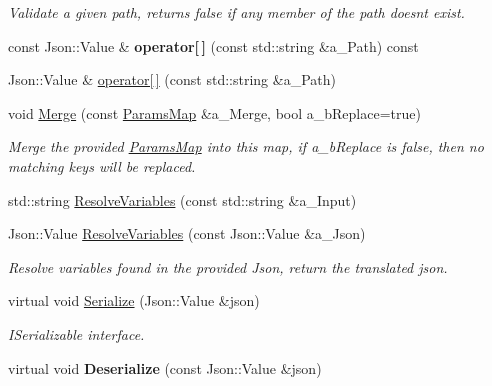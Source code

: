 \begin{DoxyCompactItemize}
\begin{DoxyCompactList}\small\item\em Validate a given path, returns false if any member of the path doesn\textquotesingle{}t exist. \end{DoxyCompactList}\item 
\mbox{\label{class_params_map_acf47e7ad87edf3d071a1f67eb46644e4}} 
const Json\+::\+Value \& {\bfseries operator\mbox{[}$\,$\mbox{]}} (const std\+::string \&a\+\_\+\+Path) const
\item 
Json\+::\+Value \& \hyperlink{class_params_map_a8a33e06714e2955ce0b81d27a8b59da2}{operator\mbox{[}$\,$\mbox{]}} (const std\+::string \&a\+\_\+\+Path)
\item 
\mbox{\label{class_params_map_a68e19546cb7630284ff13018ea024bc8}} 
void \hyperlink{class_params_map_a68e19546cb7630284ff13018ea024bc8}{Merge} (const \hyperlink{class_params_map}{Params\+Map} \&a\+\_\+\+Merge, bool a\+\_\+b\+Replace=true)
\begin{DoxyCompactList}\small\item\em Merge the provided \hyperlink{class_params_map}{Params\+Map} into this map, if a\+\_\+b\+Replace is false, then no matching keys will be replaced. \end{DoxyCompactList}\item 
std\+::string \hyperlink{class_params_map_ab78106a273b59aee641d5cef3b561c20}{Resolve\+Variables} (const std\+::string \&a\+\_\+\+Input)
\item 
\mbox{\label{class_params_map_a3908d17884a9ce7b1e850144632210ca}} 
Json\+::\+Value \hyperlink{class_params_map_a3908d17884a9ce7b1e850144632210ca}{Resolve\+Variables} (const Json\+::\+Value \&a\+\_\+\+Json)
\begin{DoxyCompactList}\small\item\em Resolve variables found in the provided Json, return the translated json. \end{DoxyCompactList}\item 
\mbox{\label{class_params_map_a5fc983f1478552ed0a5cdd0849bcd16d}} 
virtual void \hyperlink{class_params_map_a5fc983f1478552ed0a5cdd0849bcd16d}{Serialize} (Json\+::\+Value \&json)
\begin{DoxyCompactList}\small\item\em I\+Serializable interface. \end{DoxyCompactList}\item 
\mbox{\label{class_params_map_ae6d77e7be346eda43a0d5c8848f8b387}} 
virtual void {\bfseries Deserialize} (const Json\+::\+Value \&json)
\end{DoxyCompactItemize}



